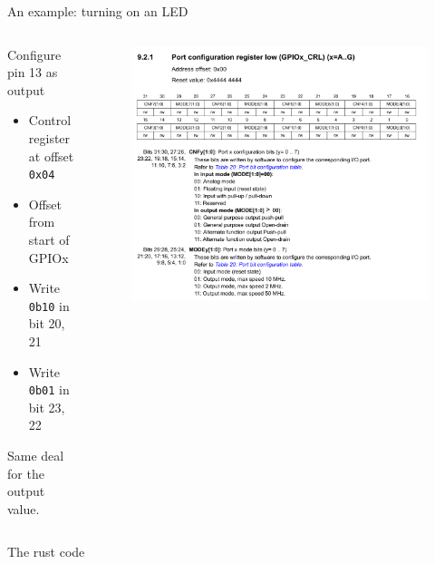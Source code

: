 \documentclass[aspectratio=169]{beamer}
\begin{document}
\begin{frame}{An example: turning on an LED}
    \begin{columns}
        \begin{column}{0.4\textwidth}
            Configure pin 13 as output

            \begin{itemize}
                \item{Control register at offset \texttt{0x04}}
                \item{Offset from start of GPIOx}
                \item{Write \texttt{0b10} in bit 20, 21}
                \item{Write \texttt{0b01} in bit 23, 22}
            \end{itemize}

            Same deal for the output value.
        \end{column}
        \begin{column}{0.6\textwidth}
            \begin{figure}
                \includegraphics[width=\textwidth]{fig/gpio_crl.png}
            \end{figure}
        \end{column}
    \end{columns}
\end{frame}

\begin{frame}{The rust code}
    \vspace{-0.5cm}
    \begin{linehighlight}{
    }
        
    \end{linehighlight}
\end{frame}
\end{document}
